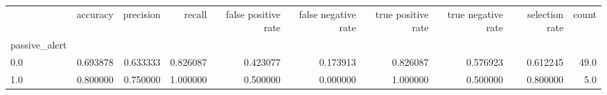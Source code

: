 \begin{tabular}{lrrrrrrrrr}
\toprule
{} &  accuracy &  precision &    recall &  false positive rate &  false negative rate &  true positive rate &  true negative rate &  selection rate &  count \\
passive\_alert &           &            &           &                      &                      &                     &                     &                 &        \\
\midrule
0.0           &  0.693878 &   0.633333 &  0.826087 &             0.423077 &             0.173913 &            0.826087 &            0.576923 &        0.612245 &   49.0 \\
1.0           &  0.800000 &   0.750000 &  1.000000 &             0.500000 &             0.000000 &            1.000000 &            0.500000 &        0.800000 &    5.0 \\
\bottomrule
\end{tabular}
